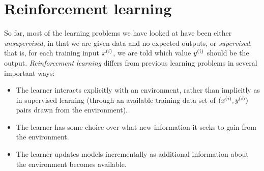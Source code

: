 \chapter{Reinforcement learning}
\label{chap-reinforcement}

So far, most of the learning problems we have looked at have been either
  {\em unsupervised}, in that we are given data and no expected outputs,
or {\em supervised}, that is, for each training input $x^{(i)}$, we
are told which value $y^{(i)}$ should be the output.
  {\em Reinforcement learning} differs from
previous learning problems in several important ways:

\begin{itemize}
  \item The learner interacts explicitly with an environment, rather
        than implicitly as in supervised learning (through an available
        training data set of $(x^{(i)}, y^{(i)})$ pairs drawn from the
        environment).
  \item The learner has some choice over what new information it
        seeks to gain from the environment.
  \item The learner updates models incrementally  as additional information about the
        environment becomes available.
\end{itemize}

